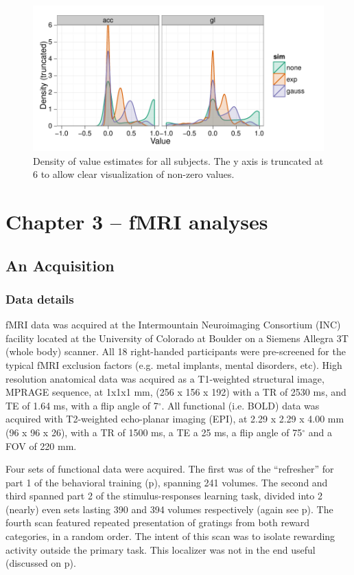 \documentclass[doc,12pt]{apa}        %
\begin{document}
\begin{figure}[tp]
	\includegraphics{f_density_value}
    \centering
    \caption{Density of value estimates for all subjects.  The y axis is truncated at 6 to allow clear visualization of non-zero values.}
	\label{fig:denvalue}
\end{figure}

\clearpage
\newpage
\section{Chapter 3 -- fMRI analyses} %
\label{sec:task_and_models}
\subsection{An Acquisition}
\label{sub:acquired}
\subsubsection{Data details}
\label{subsub:datadetails}
fMRI data was acquired at the Intermountain Neuroimaging Consortium (INC) facility located at the University of Colorado at Boulder on a Siemens Allegra 3T (whole body) scanner.  All 18 right-handed participants were pre-screened for the typical fMRI exclusion factors (e.g. metal implants, mental disorders, etc).  High resolution anatomical data was acquired as a T1-weighted structural image, MPRAGE sequence, at 1x1x1 mm, (256 x 156 x 192) with a TR of 2530 ms, and TE of 1.64 ms, with a flip angle of 7$^\circ$.  All functional (i.e. BOLD) data was acquired with T2-weighted echo-planar imaging (EPI), at 2.29 x 2.29 x 4.00 mm (96 x 96 x 26), with a TR of 1500 ms, a TE a 25 ms, a flip angle of 75$^\circ$ and a FOV of 220 mm.

Four sets of functional data were acquired.  The first was of the ``refresher'' for part 1 of the behavioral training (p\pageref{subsub:whatwhen}), spanning 241 volumes.  The second and third spanned part 2 of the stimulus-responses learning task, divided into 2 (nearly) even sets lasting 390 and 394 volumes respectively (again see p\pageref{subsub:whatwhen}).  The fourth scan featured repeated presentation of gratings from both reward categories, in a random order.  The intent of this scan was to isolate rewarding activity outside the primary task. This localizer was not in the end useful (discussed on p\pageref{subsub:chunks}).
\end{document}
